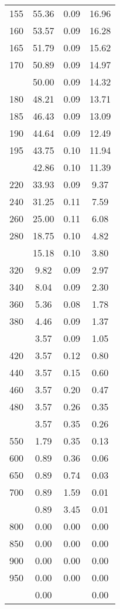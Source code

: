 \begin{table}[ht]
\begin{tabular}{lccc}
  155 & 55.36 & 0.09 & 16.96 \\ 
  160 & 53.57 & 0.09 & 16.28 \\ 
  165 & 51.79 & 0.09 & 15.62 \\ 
  170 & 50.89 & 0.09 & 14.97 \\ 
   \addlinespace
175 & 50.00 & 0.09 & 14.32 \\ 
  180 & 48.21 & 0.09 & 13.71 \\ 
  185 & 46.43 & 0.09 & 13.09 \\ 
  190 & 44.64 & 0.09 & 12.49 \\ 
  195 & 43.75 & 0.10 & 11.94 \\ 
   \addlinespace
200 & 42.86 & 0.10 & 11.39 \\ 
  220 & 33.93 & 0.09 & 9.37 \\ 
  240 & 31.25 & 0.11 & 7.59 \\ 
  260 & 25.00 & 0.11 & 6.08 \\ 
  280 & 18.75 & 0.10 & 4.82 \\ 
   \addlinespace
300 & 15.18 & 0.10 & 3.80 \\ 
  320 & 9.82 & 0.09 & 2.97 \\ 
  340 & 8.04 & 0.09 & 2.30 \\ 
  360 & 5.36 & 0.08 & 1.78 \\ 
  380 & 4.46 & 0.09 & 1.37 \\ 
   \addlinespace
400 & 3.57 & 0.09 & 1.05 \\ 
  420 & 3.57 & 0.12 & 0.80 \\ 
  440 & 3.57 & 0.15 & 0.60 \\ 
  460 & 3.57 & 0.20 & 0.47 \\ 
  480 & 3.57 & 0.26 & 0.35 \\ 
   \addlinespace
500 & 3.57 & 0.35 & 0.26 \\ 
  550 & 1.79 & 0.35 & 0.13 \\ 
  600 & 0.89 & 0.36 & 0.06 \\ 
  650 & 0.89 & 0.74 & 0.03 \\ 
  700 & 0.89 & 1.59 & 0.01 \\ 
   \addlinespace
750 & 0.89 & 3.45 & 0.01 \\ 
  800 & 0.00 & 0.00 & 0.00 \\ 
  850 & 0.00 & 0.00 & 0.00 \\ 
  900 & 0.00 & 0.00 & 0.00 \\ 
  950 & 0.00 & 0.00 & 0.00 \\ 
   \addlinespace
1000 & 0.00 &  & 0.00 \\ 
   \bottomrule
\end{tabular}
\end{table}
